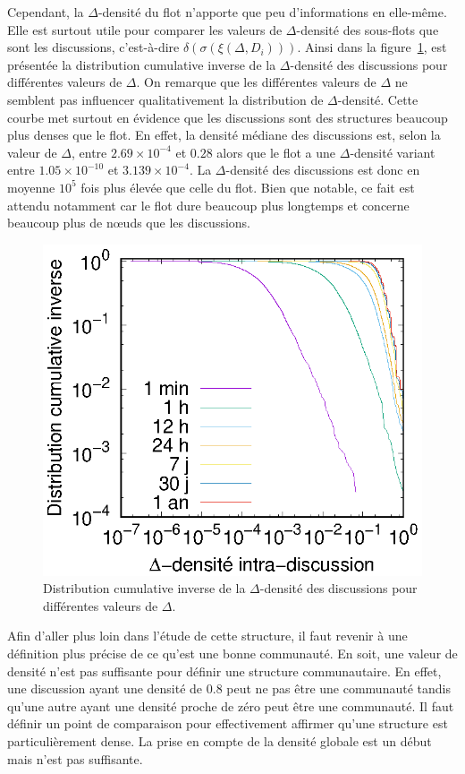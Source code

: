 Cependant, la $\Delta$-densité du flot n'apporte que peu d'informations en elle-même.
Elle est surtout utile pour comparer les valeurs de $\Delta$-densité des sous-flots que sont les discussions, c'est-à-dire  $\delta(\sigma(\xi(\Delta,D_i)))$.
Ainsi dans la figure~\ref{fig:intra_dens_discussion}, est présentée la distribution cumulative inverse de la $\Delta$-densité des discussions pour différentes valeurs de $\Delta$.
On remarque que les différentes valeurs de $\Delta$ ne semblent pas influencer qualitativement la distribution de $\Delta$-densité.
Cette courbe met surtout en évidence que les discussions sont des structures beaucoup plus denses que le flot.
En effet, la densité médiane des discussions est, selon la valeur de $\Delta$, entre $2.69 \times 10^{-4}$ et $0.28$ alors que le flot a une $\Delta$-densité variant entre $1.05  \times 10^{-10}$ et $3.139 \times 10^{-4}$.
La $\Delta$-densité des discussions est donc en moyenne $10^{5}$ fois plus élevée que celle du flot.
Bien que notable, ce fait est attendu notamment car le flot dure beaucoup plus longtemps et concerne beaucoup plus de n\oe{}uds que les discussions.
\begin{figure}
\centering
	\includegraphics[width=0.4\linewidth]{img/mailing/delta.eps}

\caption{Distribution cumulative inverse de la $\Delta$-densité des discussions pour différentes valeurs de $\Delta$.}
\label{fig:intra_dens_discussion}
\end{figure}

Afin d'aller plus loin dans l'étude de cette structure, il faut revenir à une définition plus précise de ce qu'est une bonne communauté.
En soit, une valeur de densité n'est pas suffisante pour définir une structure communautaire.
En effet, une discussion ayant une densité de $0.8$ peut  ne pas être une communauté tandis qu'une autre ayant une densité proche de zéro peut être une communauté.
Il faut définir un point de comparaison pour effectivement affirmer qu'une structure est particulièrement dense.
La prise en compte de la densité globale est un début mais n'est pas suffisante.

